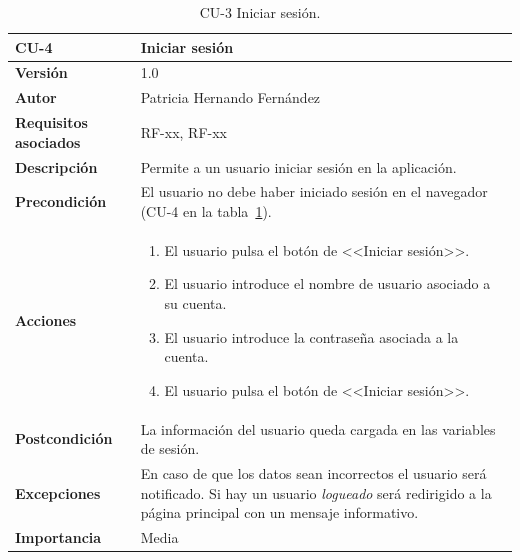 \begin{table}[p]
	\centering
	\begin{tabularx}{\linewidth}{ p{} p{} }
		\toprule
		\textbf{CU-4}    & \textbf{Iniciar sesión}\\
		\toprule
		\textbf{Versión}              & 1.0    \\
		\textbf{Autor}                & Patricia Hernando Fernández \\
		\textbf{Requisitos asociados} & RF-xx, RF-xx \\
		\textbf{Descripción}          & Permite a un usuario iniciar sesión en la aplicación.\\
		\textbf{Precondición}         & El usuario no debe haber iniciado sesión en el navegador (CU-4 en la tabla~\ref{cu:iniciar-sesion}). \\
		\textbf{Acciones}             &
		\begin{enumerate}
			\def\labelenumi{\arabic{enumi}.}
			\tightlist
			\item El usuario pulsa el botón de <<Iniciar sesión>>.
			\item El usuario introduce el nombre de usuario asociado a su cuenta.
			\item El usuario introduce la contraseña asociada a la cuenta.
			\item El usuario pulsa el botón de <<Iniciar sesión>>.
		\end{enumerate}\\
		\textbf{Postcondición}        & La información del usuario queda cargada en las variables de sesión. \\
		\textbf{Excepciones}          & En caso de que los datos sean incorrectos el usuario será notificado. Si hay un usuario \textit{logueado} será redirigido a la página principal con un mensaje informativo.\\
		\textbf{Importancia}          & Media \\
		\bottomrule
	\end{tabularx}
	\caption{CU-3 Iniciar sesión.}
	\label{cu:iniciar-sesion}
\end{table}

